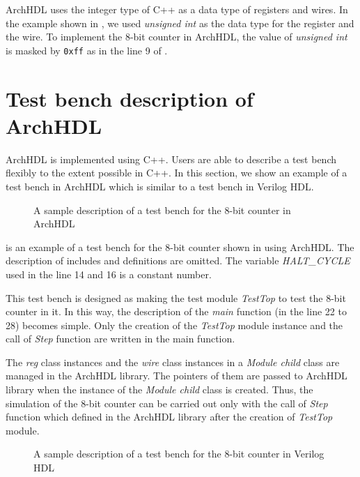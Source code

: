 ArchHDL uses the integer type of C++ as a data type of registers and wires.
In the example shown in , we used \textit{unsigned int} as the data type for the register and the wire.
To implement the 8-bit counter in ArchHDL, the value of \textit{unsigned int} is masked by \texttt{0xff} as in the line 9 of .


\section{Test bench description of ArchHDL}

ArchHDL is implemented using C++.
Users are able to describe a test bench flexibly to the extent possible in C++.
In this section, we show an example of a test bench in ArchHDL which is similar to a test bench in Verilog HDL.

\begin{figure}[t]
 
 \caption{A sample description of a test bench for the 8-bit counter in ArchHDL}
 \label{src:test}
\end{figure}

 is an example of a test bench for the 8-bit counter shown in  using ArchHDL.
The description of includes and definitions are omitted.
The variable \textit{HALT\_CYCLE} used in the line 14 and 16 is a constant number.

This test bench is designed as making the test module \textit{TestTop} to test the 8-bit counter in it.
In this way, the description of the \textit{main} function (in the line 22 to 28) becomes simple.
Only the creation of the \textit{TestTop} module instance and the call of \textit{Step} function are written in the main function.

The \textit{reg} class instances and the \textit{wire} class instances in a \textit{Module child} class are managed in the ArchHDL library.
The pointers of them are passed to ArchHDL library when the instance of the \textit{Module child} class is created.
Thus, the simulation of the 8-bit counter can be carried out only with the call of \textit{Step} function which defined in the ArchHDL library after the creation of \textit{TestTop} module.

\begin{figure}[t]
 
 \caption{A sample description of a test bench for the 8-bit counter in Verilog HDL}
 \label{src:test_v}
\end{figure}

